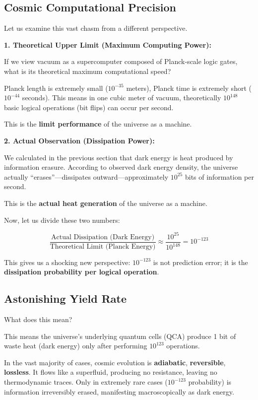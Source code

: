 \documentclass[11pt,a4paper,twoside]{book}
\begin{document}
\subsection{Cosmic Computational Precision}

Let us examine this vast chasm from a different perspective.

\textbf{1. Theoretical Upper Limit (Maximum Computing Power):}

If we view vacuum as a supercomputer composed of Planck-scale logic gates, what is its theoretical maximum computational speed?

Planck length is extremely small ($10^{-35}$ meters), Planck time is extremely short ($10^{-44}$ seconds). This means in one cubic meter of vacuum, theoretically $10^{148}$ basic logical operations (bit flips) can occur per second.

This is the \textbf{limit performance} of the universe as a machine.

\textbf{2. Actual Observation (Dissipation Power):}

We calculated in the previous section that dark energy is heat produced by information erasure. According to observed dark energy density, the universe actually ``erases''---dissipates outward---approximately $10^{25}$ bits of information per second.

This is the \textbf{actual heat generation} of the universe as a machine.

Now, let us divide these two numbers:

$$\frac{\text{Actual Dissipation (Dark Energy)}}{\text{Theoretical Limit (Planck Energy)}} \approx \frac{10^{25}}{10^{148}} = 10^{-123}$$

This gives us a shocking new perspective: $10^{-123}$ is not prediction error; it is the \textbf{dissipation probability per logical operation}.

\subsection{Astonishing Yield Rate}

What does this mean?

This means the universe's underlying quantum cells (QCA) produce 1 bit of waste heat (dark energy) only after performing $10^{123}$ operations.

In the vast majority of cases, cosmic evolution is \textbf{adiabatic}, \textbf{reversible}, \textbf{lossless}. It flows like a superfluid, producing no resistance, leaving no thermodynamic traces. Only in extremely rare cases ($10^{-123}$ probability) is information irreversibly erased, manifesting macroscopically as dark energy.
\end{document}
